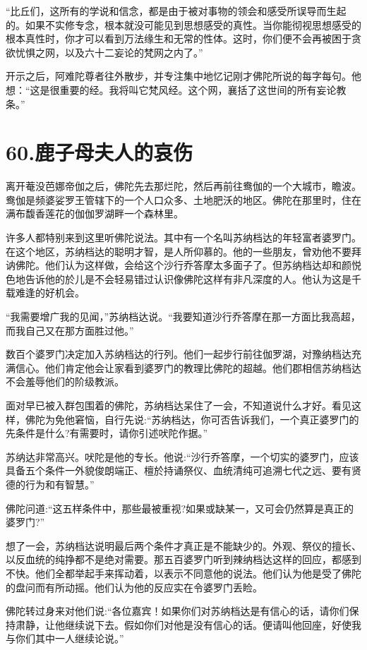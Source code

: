 \documentclass[12pt,twoside,openany]{book}
\begin{document}
“比丘们，这所有的学说和信念，都是由于被对事物的领会和感受所误导而生起的。如果不实修专念，根本就没可能见到思想感受的真性。当你能彻视思想感受的根本真性时，你才可以看到万法缘生和无常的性体。这时，你们便不会再被困于贪欲忧惧之网，以及六十二妄论的梵网之内了。”

开示之后，阿难陀尊者往外散步，并专注集中地忆记刚才佛陀所说的每字每句。他想：“这是很重要的经。我将叫它梵风经。这个网，襄括了这世间的所有妄论教条。”


\chapter{60.鹿子母夫人的哀伤}\label{ch60}

离开菴没芭娜帝伽之后，佛陀先去那烂陀，然后再前往鸯伽的一个大城市，瞻波。鸯伽是频婆娑罗王管辖下的一个人口众多、土地肥沃的地区。佛陀在那里时，住在满布馥香莲花的伽伽罗湖畔一个森林里。

许多人都特别来到这里听佛陀说法。其中有一个名叫苏纳档达的年轻富者婆罗门。在这个地区，苏纳档达的聪明才智，是人所仰慕的。他的一些朋友，曾劝他不要拜讷佛陀。他们认为这样做，会给这个沙行乔答摩太多面子了。但苏纳档达却和颜悦色地告诉他的於儿是不会轻易错过认识像佛陀这样有非凡深度的人。他认为这是千载难逢的好机会。

“我需要增广我的见闻，”苏纳档达说。“我要知道沙行乔答摩在那一方面比我高超，而我自己又在那方面胜过他。”

数百个婆罗门决定加入苏纳档达的行列。他们一起步行前往伽罗湖，对豫纳档达充满信心。他们肯定他会让家看到婆罗门的教理比佛陀的超越。他们郡相信苏纳档达不会羞辱他们的阶级教派。

面对早已被入群包围着的佛陀，苏纳档达呆住了一会，不知道说什么才好。看见这样，佛陀为免他窘恼，自行先说:“苏纳档达，你可否告诉我们，一个真正婆罗门的先条件是什么?有需要时，请你引述吠陀作据。”

苏纳达非常高兴。吠陀是他的专长。他说:“沙行乔答摩，一个切实的婆罗门，应该具备五个条件一外貌俊朗端正、檀於持诵祭仪、血统清纯可追溯七代之远、要有贤德的行为和有智慧。”

佛陀问道:“这五样条件中，那些最被重视?如果或缺某一，又可会仍然算是真正的婆罗门?”

想了一会，苏纳档达说明最后两个条件才真正是不能缺少的。外观、祭仪的擅长、以反血统的纯挣都不是绝对需要。那五百婆罗门听到辣纳档达这样的回应，都感到不快。他们全都举起手来挥动着，以表示不同意他的说法。他们认为他是受了佛陀的盘问而有所动摇。他们认为他的反应实在令婆罗门丢睑。

佛陀转过身来对他们说:“各位嘉宾！如果你们对苏纳档达是有信心的话，请你们保持肃静，让他继续说下去。假如你们对他是没有信心的话。便请叫他回座，好使我与你们其中一人继续论说。”
\end{document}
